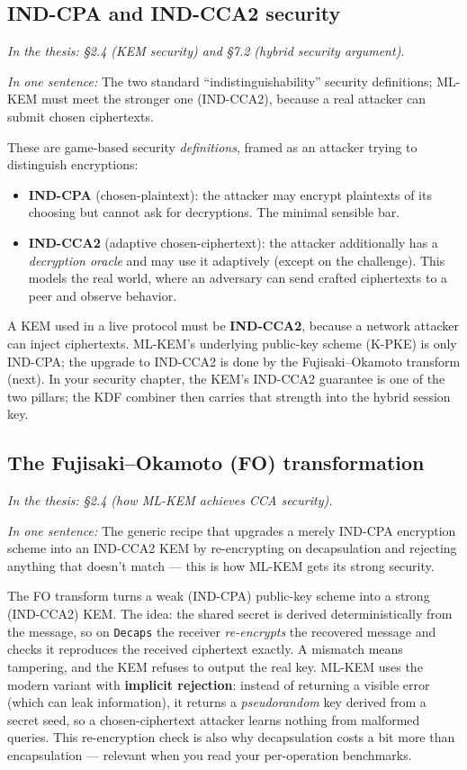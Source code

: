 \documentclass[11pt]{article}
\newcommand{\seethesis}[1]{%
  {\small\color{softgray}\textit{In the thesis: #1}}\par\vspace{3pt}}
\newcommand{\nutshell}[1]{\noindent\textit{In one sentence:} #1\par\vspace{4pt}}
\begin{document}
\subsection{IND-CPA and IND-CCA2 security}
\seethesis{\S2.4 (KEM security) and \S7.2 (hybrid security argument).}
\nutshell{The two standard ``indistinguishability'' security definitions; ML-KEM
must meet the stronger one (IND-CCA2), because a real attacker can submit chosen
ciphertexts.}

These are game-based security \emph{definitions}, framed as an attacker trying to
distinguish encryptions:
\begin{itemize}
  \item \textbf{IND-CPA} (chosen-plaintext): the attacker may encrypt plaintexts
  of its choosing but cannot ask for decryptions. The minimal sensible bar.
  \item \textbf{IND-CCA2} (adaptive chosen-ciphertext): the attacker additionally
  has a \emph{decryption oracle} and may use it adaptively (except on the
  challenge). This models the real world, where an adversary can send crafted
  ciphertexts to a peer and observe behavior.
\end{itemize}
A KEM used in a live protocol must be \textbf{IND-CCA2}, because a network
attacker can inject ciphertexts. ML-KEM's underlying public-key scheme (K-PKE) is
only IND-CPA; the upgrade to IND-CCA2 is done by the Fujisaki--Okamoto transform
(next). In your security chapter, the KEM's IND-CCA2 guarantee is one of the two
pillars; the KDF combiner then carries that strength into the hybrid session key.

\subsection{The Fujisaki--Okamoto (FO) transformation}
\seethesis{\S2.4 (how ML-KEM achieves CCA security).}
\nutshell{The generic recipe that upgrades a merely IND-CPA encryption scheme
into an IND-CCA2 KEM by re-encrypting on decapsulation and rejecting anything
that doesn't match --- this is how ML-KEM gets its strong security.}

The FO transform turns a weak (IND-CPA) public-key scheme into a strong
(IND-CCA2) KEM. The idea: the shared secret is derived deterministically from the
message, so on \texttt{Decaps} the receiver \emph{re-encrypts} the recovered
message and checks it reproduces the received ciphertext exactly. A mismatch
means tampering, and the KEM refuses to output the real key. ML-KEM uses the
modern variant with \textbf{implicit rejection}: instead of returning a visible
error (which can leak information), it returns a \emph{pseudorandom} key derived
from a secret seed, so a chosen-ciphertext attacker learns nothing from
malformed queries. This re-encryption check is also why decapsulation costs a bit
more than encapsulation --- relevant when you read your per-operation benchmarks.
\end{document}
